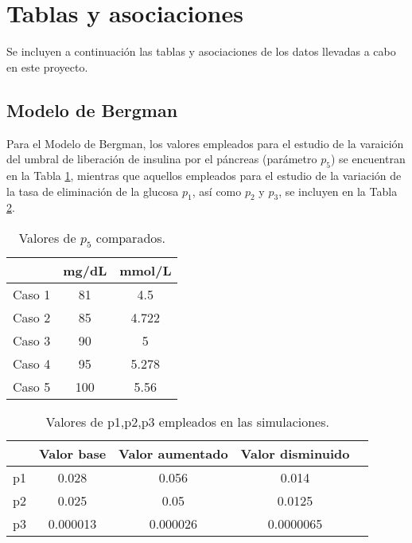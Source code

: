 

\section{Tablas y asociaciones}

Se incluyen a continuación las tablas y asociaciones de los datos llevadas a cabo en este proyecto. 

\subsection{Modelo de Bergman}

Para el Modelo de Bergman, los valores empleados para el estudio de la varaición del umbral de liberación de insulina por el páncreas (parámetro $p_5$) se encuentran en la Tabla \ref{tab:p5}, mientras que aquellos empleados para el estudio de la variación de la tasa de eliminación de la glucosa $p_1$, así como $p_2$ y $p_3$, se incluyen en la Tabla \ref{tab:p123}.

\begin{table}[htbp]
    \centering
    \caption{Valores de $p_5$ comparados.}
    \begin{tabular}{|c|c|c|}
        \hline
          & mg/dL & mmol/L  \\
        \hline
        Caso 1 & 81 & 4.5  \\
        Caso 2 & 85 & 4.722  \\
        Caso 3 & 90 & 5 \\
        Caso 4 & 95 & 5.278 \\
        Caso 5 & 100 & 5.56 \\
        \hline
    \end{tabular}
    \label{tab:p5}
\end{table}

\begin{table}[htbp]
    \centering
    \caption{Valores de p1,p2,p3 empleados en las simulaciones.}
    \begin{tabular}{|c|c|c|c|c|}
        \hline
          & Valor base & Valor aumentado & Valor disminuido \\
        \hline
        p1 & 0.028 & 0.056 & 0.014 \\
        p2 & 0.025 & 0.05 & 0.0125 \\
        p3 & 0.000013 & 0.000026 & 0.0000065 \\
        \hline
    \end{tabular}
    \label{tab:p123}
\end{table}

